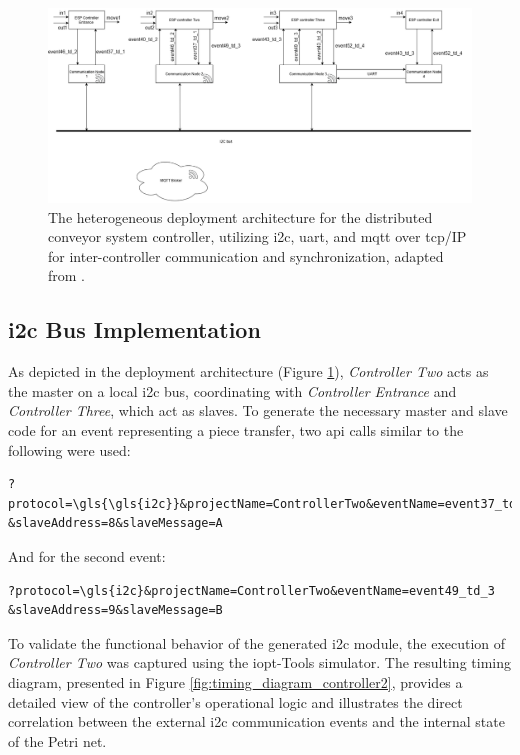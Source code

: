 \begin{figure}[htb]
    \centering
    \includegraphics[width=1\textwidth]{Chapters/Figures/prototypelayout.png}
\caption{The heterogeneous deployment architecture for the distributed conveyor system controller, utilizing \gls{i2c}, \gls{uart}, and \gls{mqtt} over \gls{tcp}/IP for inter-controller communication and synchronization, adapted from \cite{tavaresgomes2026}.}
    \label{fig:deployment_layout}
\end{figure}


\subsection{\gls{i2c} Bus Implementation}
As depicted in the deployment architecture (Figure \ref{fig:deployment_layout}), \textit{Controller Two} acts as the master on a local \gls{i2c} bus, coordinating with \textit{Controller Entrance} and \textit{Controller Three}, which act as slaves. To generate the necessary master and slave code for an event representing a piece transfer, two \gls{api} calls similar to the following were used:

\begin{verbatim}
?protocol=\gls{\gls{i2c}}&projectName=ControllerTwo&eventName=event37_td_1
&slaveAddress=8&slaveMessage=A
\end{verbatim}

And for the second event:
\begin{verbatim}
?protocol=\gls{i2c}&projectName=ControllerTwo&eventName=event49_td_3
&slaveAddress=9&slaveMessage=B
\end{verbatim}

To validate the functional behavior of the generated \gls{i2c} module, the execution of \textit{Controller Two} was captured using the \gls{iopt}-Tools simulator. The resulting timing diagram, presented in Figure \ref{fig:timing_diagram_controller2}, provides a detailed view of the controller's operational logic and illustrates the direct correlation between the external \gls{i2c} communication events and the internal state of the Petri net.  

